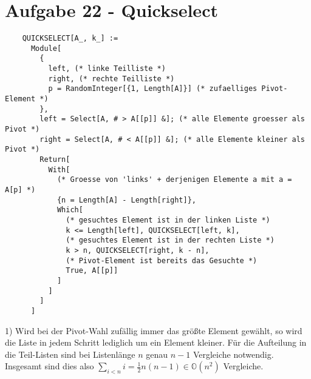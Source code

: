 \section*{Aufgabe 22 - Quickselect}
  \newcommand{\meanv}{\overline{v}}
  \lstset{ %
    language=Mathematica,
    basicstyle=\small,
    numbers=left,
    numberstyle=\small,
    numbersep=-9pt
  }
  \begin{lstlisting}
    QUICKSELECT[A_, k_] :=
      Module[
        {
          left, (* linke Teilliste *)
          right, (* rechte Teilliste *)
          p = RandomInteger[{1, Length[A]}] (* zufaelliges Pivot-Element *)
        },
        left = Select[A, # > A[[p]] &]; (* alle Elemente groesser als Pivot *)
        right = Select[A, # < A[[p]] &]; (* alle Elemente kleiner als Pivot *)
        Return[
          With[
            (* Groesse von 'links' + derjenigen Elemente a mit a = A[p] *)
            {n = Length[A] - Length[right]},
            Which[
              (* gesuchtes Element ist in der linken Liste *)
              k <= Length[left], QUICKSELECT[left, k],
              (* gesuchtes Element ist in der rechten Liste *)
              k > n, QUICKSELECT[right, k - n],
              (* Pivot-Element ist bereits das Gesuchte *)
              True, A[[p]]
            ]
          ]
        ]
      ]
  \end{lstlisting}
\begin{paragraph}{1)}
  Wird bei der Pivot-Wahl zufällig immer das größte Element gewählt, so wird
  die Liste in jedem Schritt lediglich um ein Element kleiner. Für die
  Aufteilung in die Teil-Listen sind bei Listenlänge $n$ genau $n-1$ Vergleiche
  notwendig. Insgesamt sind dies also $\sum_{i<n}i = \frac{1}{2}n(n-1) \in
  \mathbb{O}(n^2)$ Vergleiche.
\end{paragraph}

